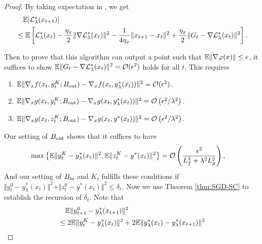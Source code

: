 \thmFBSA*

\begin{proof} By taking expectation in , we get
\begin{align} \label{eq:des-stoc}
\begin{split}
    &\quad {\mathbb{E}}[ {\mathcal{L}}_{\lambda}^*(x_{t+1})]  \\
    &\le {\mathbb{E}} \left[{\mathcal{L}}_{\lambda}^*(x_t) 
    - \frac{\eta_x}{2} \Vert \nabla {\mathcal{L}}_{\lambda}^*(x_t) \Vert^2 - 
    \frac{1}{4\eta_x} \Vert x_{t+1} - x_{t} \Vert^2
    + \frac{\eta_x}{2} \Vert G_t - \nabla {\mathcal{L}}_{\lambda}^*(x_t) \Vert^2 \right].
\end{split}
\end{align}

Then to prove that this algorithm can output a point such that ${\mathbb{E}} \Vert \nabla \varphi(x) \Vert \le \epsilon$, it
suffices to show ${\mathbb{E}} \Vert G_t - \nabla {\mathcal{L}}_{\lambda}^*(x_t) \Vert^2 = {\mathcal{O}}(\epsilon^2)$ holds for all $t$. This requires
\begin{enumerate}[label=\alph*.]
\item ${\mathbb{E}} \Vert \nabla_x f(x_t,y_t^K;B_{\rm out}) - \nabla_x f(x_t,y_{\lambda}^*(x_t)) \Vert^2 = {\mathcal{O}}(\epsilon^2)$.
\item ${\mathbb{E}} \Vert \nabla_x g(x_t,y_t^K;B_{\rm out}) - \nabla_x g(x_t,y_{\lambda}^*(x_t)) \Vert^2 = {\mathcal{O}}\left( \epsilon^2/ \lambda^2 \right)$.
\item $  {\mathbb{E}} \Vert \nabla_x g(x_t,z_t^K;B_{\rm out}) - \nabla_x g(x_t,y^*(x_t)) \Vert^2 = {\mathcal{O}}\left( {\epsilon^2}/{\lambda^2} \right)$.
\end{enumerate}
Our setting of $B_{\rm out}$ shows that it suffices to have
\begin{align*}
\max \left\{ {\mathbb{E}} \Vert y_t^K - y_{\lambda}^*(x_t) \Vert^2 ,{\mathbb{E}} \Vert z_t^K - y^*(x_t) \Vert^2 \right\}  &= {\mathcal{O}} \left( \frac{\epsilon^2}{L_f^2+ \lambda^2 L_g^2} \right), 
\end{align*}
And our setting of $B_{\rm in}$ and $K_t$ fulfills these conditions if $\Vert y_t^0 - y_{\lambda}^*(x_t) \Vert^2 + \Vert z_t^0 - y^*(x_t) \Vert^2 \le \delta_t$.
Now we use Theorem \ref{thm:SGD-SC} to establish the recursion of $\delta_t$. Note that
\begin{align} \label{eq:recursion-delta-t}
\begin{split}
    &\quad \BE \Vert y_{t+1}^0- y_{\lambda}^*(x_{t+1}) \Vert^2  \\
    & \le 2 \BE \Vert y_t^K- y_{\lambda}^*(x_{t}) \Vert^2 + 2 \BE \Vert y_{\lambda}^*(x_{t}) - y_{\lambda}^*(x_{t+1}) \Vert^2 \\

\end{split}
\end{align}
\end{proof}
